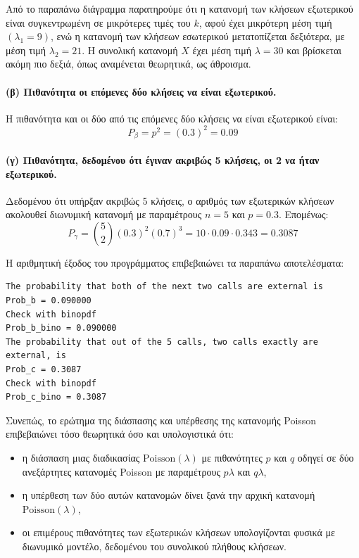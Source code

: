 \documentclass{article}
\begin{document}
Από το παραπάνω διάγραμμα παρατηρούμε ότι η κατανομή των κλήσεων εξωτερικού είναι
συγκεντρωμένη σε μικρότερες τιμές του \(k\), αφού έχει μικρότερη μέση τιμή
\((\lambda_1 = 9)\), ενώ η κατανομή των κλήσεων εσωτερικού μετατοπίζεται δεξιότερα, με
μέση τιμή \(\lambda_2 = 21\). Η συνολική κατανομή \(X\) έχει μέση τιμή \(\lambda = 30\)
και βρίσκεται ακόμη πιο δεξιά, όπως αναμένεται θεωρητικά, ως άθροισμα.

\paragraph{(β) Πιθανότητα οι επόμενες δύο κλήσεις να είναι εξωτερικού.}

Η πιθανότητα και οι δύο από τις επόμενες δύο κλήσεις να είναι εξωτερικού είναι:
\begin{equation}
    P_{\beta} = p^2 = (0.3)^2 = 0.09
\end{equation}

\paragraph{(γ) Πιθανότητα, δεδομένου ότι έγιναν ακριβώς 5 κλήσεις, οι 2 να ήταν εξωτερικού.}

Δεδομένου ότι υπήρξαν ακριβώς 5 κλήσεις, ο αριθμός των εξωτερικών κλήσεων ακολουθεί
διωνυμική κατανομή με παραμέτρους \(n=5\) και \(p=0.3\). Επομένως:
\begin{equation}
    P_{\gamma}
    =
    \binom{5}{2}(0.3)^2(0.7)^3
    =
    10 \cdot 0.09 \cdot 0.343
    =
    0.3087
\end{equation}

Η αριθμητική έξοδος του προγράμματος επιβεβαιώνει τα παραπάνω αποτελέσματα:

\begin{verbatim}
The probability that both of the next two calls are external is
Prob_b = 0.090000
Check with binopdf
Prob_b_bino = 0.090000
The probability that out of the 5 calls, two calls exactly are external, is
Prob_c = 0.3087
Check with binopdf
Prob_c_bino = 0.3087
\end{verbatim}

Συνεπώς, το ερώτημα της διάσπασης και υπέρθεσης της κατανομής Poisson επιβεβαιώνει τόσο
θεωρητικά όσο και υπολογιστικά ότι:
\begin{itemize}
    \item η διάσπαση μιας διαδικασίας \(\mathrm{Poisson}(\lambda)\) με πιθανότητες \(p\) και \(q\)
    οδηγεί σε δύο ανεξάρτητες κατανομές Poisson με παραμέτρους \(p\lambda\) και \(q\lambda\),
    \item η υπέρθεση των δύο αυτών κατανομών δίνει ξανά την αρχική κατανομή
    \(\mathrm{Poisson}(\lambda)\),
    \item οι επιμέρους πιθανότητες των εξωτερικών κλήσεων υπολογίζονται φυσικά με
    διωνυμικό μοντέλο, δεδομένου του συνολικού πλήθους κλήσεων.
\end{itemize}
\end{document}
